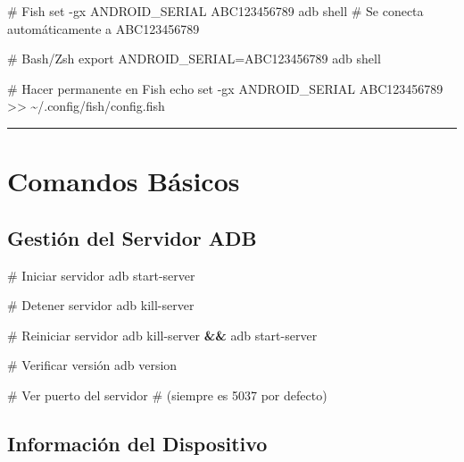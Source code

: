 \documentclass[
  doc,
  floatsintext,
  longtable,
  a4paper,
  nolmodern,
  notxfonts,
  notimes,
  12pt,
  colorlinks=true,linkcolor=blue,citecolor=blue,urlcolor=blue]{apa7}
\newenvironment{Shaded}{\begin{snugshade}}{\end{snugshade}}
\newcommand{\AttributeTok}[1]{\textcolor[rgb]{0.40,0.45,0.13}{#1}}
\newcommand{\BuiltInTok}[1]{\textcolor[rgb]{0.00,0.23,0.31}{#1}}
\newcommand{\CommentTok}[1]{\textcolor[rgb]{0.37,0.37,0.37}{#1}}
\newcommand{\ExtensionTok}[1]{\textcolor[rgb]{0.00,0.23,0.31}{#1}}
\newcommand{\KeywordTok}[1]{\textcolor[rgb]{0.00,0.23,0.31}{\textbf{#1}}}
\newcommand{\NormalTok}[1]{\textcolor[rgb]{0.00,0.23,0.31}{#1}}
\newcommand{\OperatorTok}[1]{\textcolor[rgb]{0.37,0.37,0.37}{#1}}
\newcommand{\StringTok}[1]{\textcolor[rgb]{0.13,0.47,0.30}{#1}}
\newcommand{\VariableTok}[1]{\textcolor[rgb]{0.07,0.07,0.07}{#1}}
\begin{document}
\begin{Shaded}
\begin{Highlighting}[]
\CommentTok{\# Fish}
\BuiltInTok{set} \AttributeTok{{-}gx}\NormalTok{ ANDROID\_SERIAL ABC123456789}
\ExtensionTok{adb}\NormalTok{ shell  }\CommentTok{\# Se conecta automáticamente a ABC123456789}

\CommentTok{\# Bash/Zsh}
\BuiltInTok{export} \VariableTok{ANDROID\_SERIAL}\OperatorTok{=}\NormalTok{ABC123456789}
\ExtensionTok{adb}\NormalTok{ shell}

\CommentTok{\# Hacer permanente en Fish}
\BuiltInTok{echo} \StringTok{\textquotesingle{}set {-}gx ANDROID\_SERIAL ABC123456789\textquotesingle{}} \OperatorTok{\textgreater{}\textgreater{}}\NormalTok{ \textasciitilde{}/.config/fish/config.fish}
\end{Highlighting}
\end{Shaded}

\begin{center}\rule{0.5\linewidth}{0.5pt}\end{center}

\section{Comandos Básicos}\label{comandos-buxe1sicos}

\subsection{Gestión del Servidor ADB}\label{gestiuxf3n-del-servidor-adb}

\begin{Shaded}
\begin{Highlighting}[]
\CommentTok{\# Iniciar servidor}
\ExtensionTok{adb}\NormalTok{ start{-}server}

\CommentTok{\# Detener servidor}
\ExtensionTok{adb}\NormalTok{ kill{-}server}

\CommentTok{\# Reiniciar servidor}
\ExtensionTok{adb}\NormalTok{ kill{-}server }\KeywordTok{\&\&} \ExtensionTok{adb}\NormalTok{ start{-}server}

\CommentTok{\# Verificar versión}
\ExtensionTok{adb}\NormalTok{ version}

\CommentTok{\# Ver puerto del servidor}
\CommentTok{\# (siempre es 5037 por defecto)}
\end{Highlighting}
\end{Shaded}

\subsection{Información del
Dispositivo}\label{informaciuxf3n-del-dispositivo}
\end{document}
